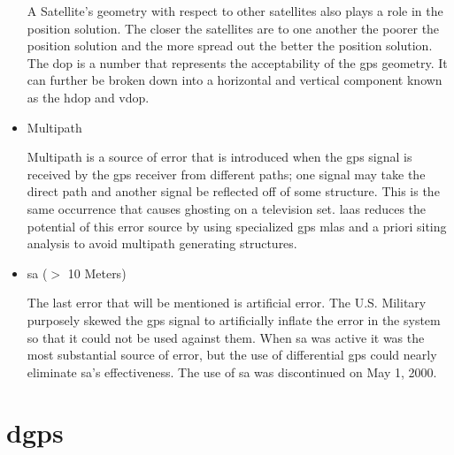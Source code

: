 \begin{itemize}
A Satellite's geometry with respect to other satellites also plays a role in the position solution.  The closer the satellites are to one another the poorer the position solution and the more spread out the better the position solution.  The \ac{dop} is a number that represents the acceptability of the \ac{gps} geometry.  It can further be broken down into a horizontal and vertical component known as the \ac{hdop} and \ac{vdop}.

	\item Multipath

Multipath is a source of error that is introduced when the \ac{gps} signal is received by the \ac{gps} receiver from different paths; one signal may take the direct path and another signal be reflected off of some structure. This is the same occurrence that causes ghosting on a television set. \ac{laas} reduces the potential of this error source by using specialized \ac{gps} \acp{mla} and a priori siting analysis to avoid multipath generating structures.

	\item \ac{sa} ($>$ 10 Meters)

The last error that will be mentioned is artificial error.  The U.S. Military purposely skewed the \ac{gps} signal to artificially inflate the error in the system so that it could not be used against them.  When \ac{sa} was active it was the most substantial source of error, but the use of differential \ac{gps} could nearly eliminate \ac{sa}'s effectiveness. The use of \ac{sa} was discontinued on May 1, 2000.

\end{itemize}

\section{\ac{dgps}\label{section:DGPS}}


